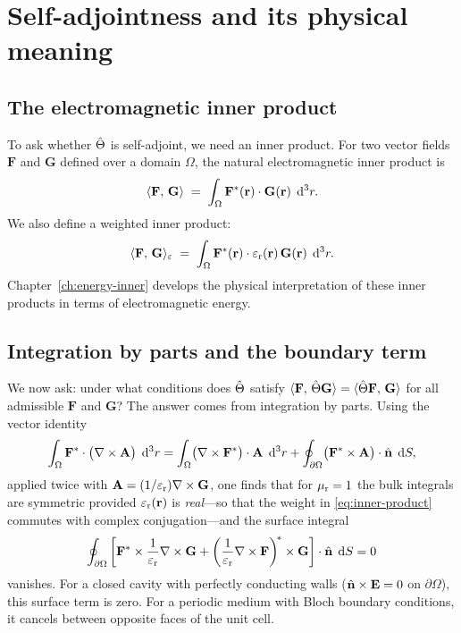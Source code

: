 \section{Self-adjointness and its physical meaning}
\label{sec:self-adjoint}

\subsection{The electromagnetic inner product}
\label{ssec:em-inner-product}

To ask whether $\hat{\Theta}$ is self-adjoint, we need an inner product. For
two vector fields $\mathbf{F}$ and $\mathbf{G}$ defined over a domain
$\Omega$, the natural electromagnetic inner product is
\begin{equation}
 \langle \mathbf{F},\,\mathbf{G}\rangle
 \;=\;
 \int_\Omega \mathbf{F}^*(\mathbf{r})\cdot\mathbf{G}(\mathbf{r})\;\mathop{}\!\mathrm{d}^3 r.
 \label{eq:inner-product-plain}
\end{equation}
We also define a weighted inner product:
\begin{equation}
 \langle \mathbf{F},\,\mathbf{G}\rangle_{\varepsilon}
 \;=\;
 \int_\Omega \mathbf{F}^*(\mathbf{r})\cdot\varepsilon_{\mathrm{r}}(\mathbf{r})\,\mathbf{G}(\mathbf{r})\;\mathop{}\!\mathrm{d}^3 r.
 \label{eq:inner-product}
\end{equation}
Chapter~\ref{ch:energy-inner} develops the physical interpretation of these
inner products in terms of electromagnetic energy.

\subsection{Integration by parts and the boundary term}
\label{ssec:ibp}

We now ask: under what conditions does $\hat{\Theta}$ satisfy
$\langle\mathbf{F},\,\hat{\Theta}\mathbf{G}\rangle
 = \langle\hat{\Theta}\mathbf{F},\,\mathbf{G}\rangle$
for all admissible $\mathbf{F}$ and $\mathbf{G}$? The answer comes
from integration by parts. Using the vector identity
\begin{equation}
 \int_\Omega \mathbf{F}^*\cdot\bigl(\nabla\times\mathbf{A}\bigr)\;\mathop{}\!\mathrm{d}^3 r
 =
 \int_\Omega \bigl(\nabla\times\mathbf{F}^*\bigr)\cdot\mathbf{A}\;\mathop{}\!\mathrm{d}^3 r
 +
 \oint_{\partial\Omega}
 \bigl(\mathbf{F}^*\times\mathbf{A}\bigr)\cdot\hat{\mathbf{n}}\;\mathop{}\!\mathrm{d} S,
 \label{eq:curl-ibp}
\end{equation}
applied twice with $\mathbf{A} = (1/\varepsilon_{\mathrm{r}})\nabla\times\mathbf{G}$, one finds
that for $\mu_{\mathrm{r}} = 1$ the bulk integrals are
symmetric provided $\varepsilon_{\mathrm{r}}(\mathbf{r})$ is \emph{real}---so that the weight in
\eqref{eq:inner-product} commutes with complex conjugation---and the
surface integral
\begin{equation}
 \oint_{\partial\Omega}
 \left[
 \mathbf{F}^*\times\frac{1}{\varepsilon_{\mathrm{r}}}\nabla\times\mathbf{G}
+
 \left(\frac{1}{\varepsilon_{\mathrm{r}}}\nabla\times\mathbf{F}\right)^{\!*}\times\mathbf{G}
 \right]\cdot\hat{\mathbf{n}}\;\mathop{}\!\mathrm{d} S
 = 0
 \label{eq:surface-vanish}
\end{equation}
vanishes. For a closed cavity with perfectly conducting walls
($\hat{\mathbf{n}}\times\mathbf{E} = 0$ on $\partial\Omega$), this surface term is zero. For
a periodic medium with Bloch boundary conditions, it cancels between
opposite faces of the unit cell.

